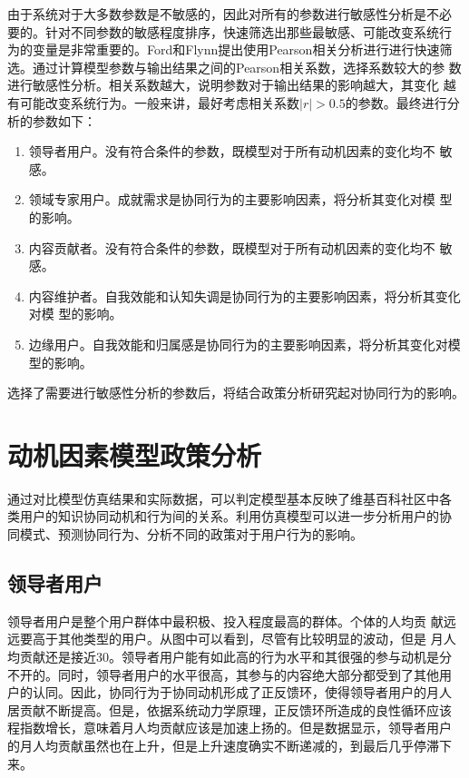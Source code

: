 由于系统对于大多数参数是不敏感的，因此对所有的参数进行敏感性分析是不必
要的。针对不同参数的敏感程度排序，快速筛选出那些最敏感、可能改变系统行
为的变量是非常重要的。Ford和Flynn提出使用Pearson相关分析进行进行快速筛
选。通过计算模型参数与输出结果之间的Pearson相关系数，选择系数较大的参
数进行敏感性分析。相关系数越大，说明参数对于输出结果的影响越大，其变化
越有可能改变系统行为。一般来讲，最好考虑相关系数$|r|>0.5$的参数。最终进行分析的参数如下：

\begin{enumerate}
\item 领导者用户。没有符合条件的参数，既模型对于所有动机因素的变化均不
  敏感。
\item 领域专家用户。成就需求是协同行为的主要影响因素，将分析其变化对模
  型的影响。
\item 内容贡献者。没有符合条件的参数，既模型对于所有动机因素的变化均不
  敏感。
\item 内容维护者。自我效能和认知失调是协同行为的主要影响因素，将分析其变化对模
  型的影响。
\item 边缘用户。自我效能和归属感是协同行为的主要影响因素，将分析其变化对模
  型的影响。
\end{enumerate}

选择了需要进行敏感性分析的参数后，将结合政策分析研究起对协同行为的影响。

\section{动机因素模型政策分析}
通过对比模型仿真结果和实际数据，可以判定模型基本反映了维基百科社区中各
类用户的知识协同动机和行为间的关系。利用仿真模型可以进一步分析用户的协
同模式、预测协同行为、分析不同的政策对于用户行为的影响。

\subsection{领导者用户}

领导者用户是整个用户群体中最积极、投入程度最高的群体。个体的人均贡
献远远要高于其他类型的用户。从图中可以看到，尽管有比较明显的波动，但是
月人均贡献还是接近30。领导者用户能有如此高的行为水平和其很强的参与动机是分
不开的。同时，领导者用户的水平很高，其参与的内容绝大部分都受到了其他用
户的认同。因此，协同行为于协同动机形成了正反馈环，使得领导者用户的月人
居贡献不断提高。但是，依据系统动力学原理，正反馈环所造成的良性循环应该
程指数增长，意味着月人均贡献应该是加速上扬的。但是数据显示，领导者用户
的月人均贡献虽然也在上升，但是上升速度确实不断递减的，到最后几乎停滞下
来。


